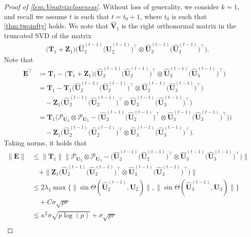 \documentclass[10pt]{article}
\newcommand{\0}{{\mathbf{0}}}
\newcommand{\1}{{\mathbf{1}}}
\newcommand{\U}{{\mathbf{U}}}
\renewcommand{\t}{^{\top}}
\newcommand{\uhat}{\mathbf{\hat{U}}}
\renewcommand{\hat}{\widehat}
\renewcommand{\hat}{\widehat}
\begin{document}
\begin{proof}[Proof of \cref{lem:Vmatrixcloseness}]
Without loss of generality, we consider $k = 1$, and recall we assume $t$ is such that $t = t_0 +1$, where $t_0$ is such that \cref{thm:twoinfty} holds.  We note that $\mathbf{\hat V}_1$ is the right orthonormal matrix in the truncated SVD of the matrix
\begin{align*}
    \bigg(\mathbf{T}_1 + \mathbf{Z}_1 \bigg) \bigg( \uhat_2^{(t-1)} \big( \uhat_2^{(t-1)} \big)\t \otimes  \uhat_3^{(t-1)} \big( \uhat_3^{(t-1)} \big)\t \bigg).
\end{align*}
Note that
\begin{align*}
    \mathbf{E}\t &\coloneqq \mathbf{T}_1 - \bigg( \mathbf{T}_1  + \mathbf{Z}_1 \bigg) \bigg( \uhat_2^{(t-1)} \big( \uhat_2^{(t-1)} \big)\t \otimes  \uhat_3^{(t-1)} \big( \uhat_3^{(t-1)} \big)\t \bigg) \\
    &= \mathbf{T}_1 - \mathbf{T}_1 \bigg( \uhat_2^{(t-1)} \big( \uhat_2^{(t-1)} \big)\t \otimes  \uhat_3^{(t-1)} \big( \uhat_3^{(t-1)} \big)\t \bigg) \\
    &\quad - \mathbf{Z}_1 \bigg( \uhat_2^{(t-1)} \big( \uhat_2^{(t-1)} \big)\t \otimes  \uhat_3^{(t-1)} \big( \uhat_3^{(t-1)} \big)\t \bigg) \\
    &= \mathbf{T}_1 \bigg( \mathcal{P}_{\U_2} \otimes \mathcal{P}_{\U_3}  - \bigg( \uhat_2^{(t-1)} \big( \uhat_2^{(t-1)} \big)\t \otimes  \uhat_3^{(t-1)} \big( \uhat_3^{(t-1)} \big)\t \bigg) \bigg) \\
    &\quad - \mathbf{Z}_1 \bigg( \uhat_2^{(t-1)} \big( \uhat_2^{(t-1)} \big)\t \otimes  \uhat_3^{(t-1)} \big( \uhat_3^{(t-1)} \big)\t \bigg).
\end{align*}
Taking norms, it holds that
\begin{align}
    \| \mathbf{E} \| &\leq \| \mathbf{T}_1 \| \bigg\| \mathcal{P}_{\U_2} \otimes \mathcal{P}_{\U_3}  - \bigg( \uhat_2^{(t-1)} \big( \uhat_2^{(t-1)} \big)\t \otimes  \uhat_3^{(t-1)} \big( \uhat_3^{(t-1)} \big)\t \bigg) \bigg\| \nonumber \\
    &\quad + \|  \mathbf{Z}_1 \bigg( \uhat_2^{(t-1)} \big( \uhat_2^{(t-1)} \big)\t \otimes  \uhat_3^{(t-1)} \big( \uhat_3^{(t-1)} \big)\t \bigg) \| \nonumber \\
    &\leq 2 \lambda_1 \max \bigg\{ \| \sin\Theta( \uhat_2^{(t-1)}, \U_2 ) \|, \| \sin\Theta(\uhat_3^{(t-1)},\U_3 ) \| \bigg\} \nonumber \\
    &\quad + C \sigma \sqrt{pr} \nonumber \\
    &\lesssim  \kappa^2  \sigma \sqrt{p\log(p)} + \sigma \sqrt{pr} \label{Ebound}  \\

\end{align}
\end{proof}
\end{document}
